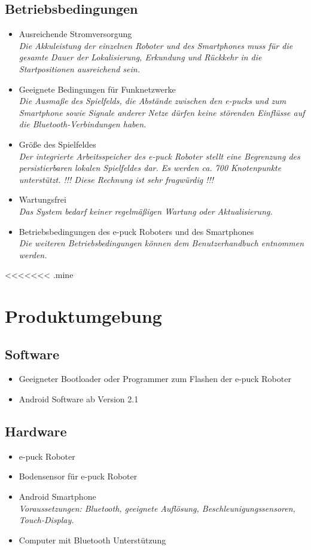 \documentclass[10pt,a4paper]{article}
\begin{document}
		\subsection{Betriebsbedingungen}
			\begin{itemize}
				\item Ausreichende Stromversorgung
					\\ \textsl{Die Akkuleistung der einzelnen Roboter und des Smartphones muss für die gesamte
						Dauer der Lokalisierung, Erkundung und Rückkehr in die Startpositionen ausreichend sein.}
				\item Geeignete Bedingungen für Funknetzwerke
					\\ \textsl{Die Ausmaße des Spielfelds, die Abstände zwischen den e-pucks und zum Smartphone sowie
						Signale anderer Netze dürfen keine störenden Einflüsse auf die Bluetooth-Verbindungen haben.}
				\item Größe des Spielfeldes
					\\ \textsl{Der integrierte Arbeitsspeicher des e-puck Roboter stellt eine Begrenzung des 
					 persistierbaren lokalen Spielfeldes dar. Es werden ca. 700 Knotenpunkte unterstützt. 
					 !!! Diese Rechnung ist sehr fragwürdig !!!}			
				\item Wartungsfrei
					\\ \textsl{Das System bedarf keiner regelmäßigen Wartung oder Aktualisierung.}		
				\item Betriebsbedingungen des e-puck Roboters und des Smartphones
					\\ \textsl{Die weiteren Betriebsbedingungen können dem Benutzerhandbuch entnommen werden.}
			\end{itemize}
<<<<<<< .mine
		\section{Produktumgebung}
			\subsection{Software}
				\begin{itemize}
					\item Geeigneter Bootloader oder Programmer zum Flashen der e-puck Roboter
					\item Android Software ab Version 2.1
				\end{itemize}
			\subsection{Hardware}
				\begin{itemize}
					\item e-puck Roboter
					\item Bodensensor für e-puck Roboter
					\item Android Smartphone
						\\ \textsl{Voraussetzungen: Bluetooth, geeignete Auflösung, Beschleunigungssensoren, Touch-Display.}
					\item Computer mit Bluetooth Unterstützung
				\end{itemize}		
\end{document}
